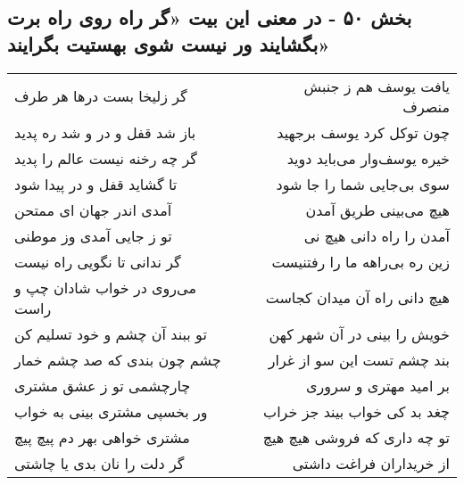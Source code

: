 \begin{center}
\section*{بخش ۵۰ - در معنی این بیت «گر راه روی راه برت بگشایند   ور نیست شوی بهستیت بگرایند»}
\label{sec:sh050}
\begin{longtable}{l p{0.5cm} r}
گر زلیخا بست درها هر طرف
&&
یافت یوسف هم ز جنبش منصرف
\\
باز شد قفل و در و شد ره پدید
&&
چون توکل کرد یوسف برجهید
\\
گر چه رخنه نیست عالم را پدید
&&
خیره یوسف‌وار می‌باید دوید
\\
تا گشاید قفل و در پیدا شود
&&
سوی بی‌جایی شما را جا شود
\\
آمدی اندر جهان ای ممتحن
&&
هیچ می‌بینی طریق آمدن
\\
تو ز جایی آمدی وز موطنی
&&
آمدن را راه دانی هیچ نی
\\
گر ندانی تا نگویی راه نیست
&&
زین ره بی‌راهه ما را رفتنیست
\\
می‌روی در خواب شادان چپ و راست
&&
هیچ دانی راه آن میدان کجاست
\\
تو ببند آن چشم و خود تسلیم کن
&&
خویش را بینی در آن شهر کهن
\\
چشم چون بندی که صد چشم خمار
&&
بند چشم تست این سو از غرار
\\
چارچشمی تو ز عشق مشتری
&&
بر امید مهتری و سروری
\\
ور بخسپی مشتری بینی به خواب
&&
چغد بد کی خواب بیند جز خراب
\\
مشتری خواهی بهر دم پیچ پیچ
&&
تو چه داری که فروشی هیچ هیچ
\\
گر دلت را نان بدی یا چاشتی
&&
از خریداران فراغت داشتی
\\
\end{longtable}
\end{center}
